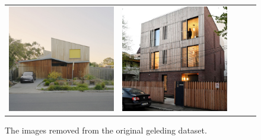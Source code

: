 \begin{figure}[H]
{\begin{tabular}{@{}ccccc@{}}
      \includegraphics[width=\linewidth]{Images/LoRAs/Geleding/12.jpg} &
      \includegraphics[width=\linewidth]{Images/LoRAs/Geleding/16.jpg} \\[2pt]
    \end{tabular}
    }
  \caption{The images removed from the original geleding dataset.}
  \label{fig:removedgeleding}
\end{figure}
